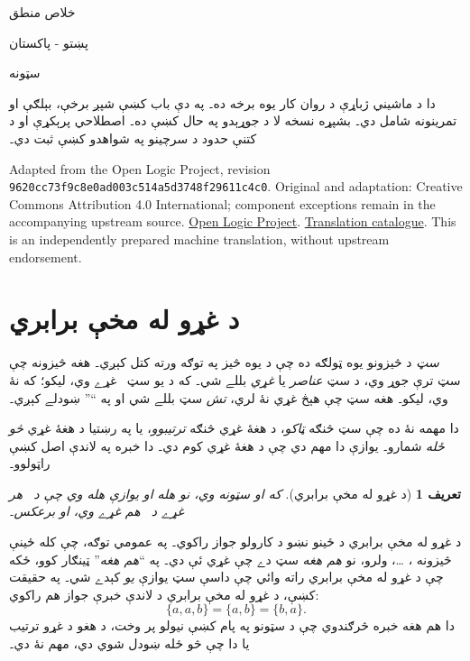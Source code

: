 \documentclass[12pt,a4paper]{article}
\newcommand{\olfileid}[3]{\gdef\pspart{#1}\gdef\pschapter{#2}\gdef\pssection{#3}}
\newcommand{\olsection}[1]{\section{#1}\label{\pspart:\pschapter:\pssection:sec}}
\newenvironment{explain}{}{}
\newtheorem{defn}{تعريف}[section]
\begin{document}
\setRTL
\begin{center}
{\Huge خلاص منطق}\par
{\Large پښتو - پاکستان}\par\medskip
{\LARGE سټونه}\par\medskip
\end{center}
دا د ماشيني ژباړې د روان کار يوه برخه ده۔ په دې باب کښې شپږ برخې، بېلګې او تمرينونه شامل دي۔ بشپړه نسخه لا د جوړېدو په حال کښې ده۔ اصطلاحي پرېکړې او د کتنې حدود د سرچينو په شواهدو کښې ثبت دي۔
\begin{LTR}\latinfont\small
Adapted from the Open Logic Project, revision
\texttt{9620cc73f9c8e0ad003c514a5d3748f29611c4c0}.
Original and adaptation: Creative Commons Attribution 4.0 International;
component exceptions remain in the accompanying upstream source.
\href{https://openlogicproject.org/}{Open Logic Project}.
\href{https://github.com/KokunoYumeto/OpenLogic-translations}{Translation catalogue}.
This is an independently prepared machine translation, without upstream endorsement.
\end{LTR}
\bigskip



\olfileid{sfr}{set}{bas}
\olsection{د غړو له مخې برابري}

\emph{سټ} د څيزونو يوه ټولګه ده چې د يوه څيز په توګه ورته کتل کېږي۔ هغه څيزونه چې سټ ترې جوړ وي، د سټ \emph{عناصر} يا \emph{غړي} بللے شي۔ که  د يو سټ~ غړے وي،  ليکو؛ که نۀ وي،  ليکو۔ هغه سټ چې هېڅ غړي نۀ لري، \emph{تش} سټ بللے شي او په ``\LR{$\emptyset$}'' ښودلے کېږي۔

\begin{explain}
دا مهمه نۀ ده چې سټ څنګه \emph{ټاکو}، د هغۀ غړي څنګه \emph{ترتيبوو}، يا په رښتيا د هغۀ غړي \emph{څو ځله} شمارو۔ يوازې دا مهم دي چې د هغۀ غړي کوم دي۔ دا خبره په لاندې اصل کښې راټولوو۔
\end{explain}

\begin{defn}[د غړو له مخې برابري]
  که  او  سټونه وي، نو  هله او يوازې هله وي چې د~ هر غړے د~ هم غړے وي، او برعکس۔
\end{defn}

د غړو له مخې برابري د ځينو نښو د کارولو جواز راکوي۔ په عمومي توګه، چې کله ځينې څيزونه ، \dots،  ولرو، نو  \emph{هم هغه} سټ دے چې غړي ئې  دي۔ په ``\emph{هم هغه}'' ټينګار کوو، ځکه چې د غړو له مخې برابري راته وائي چې داسې سټ يوازې \emph{يو} کېدے شي۔ په حقيقت کښې، د غړو له مخې برابري د لاندې خبرې جواز هم راکوي:
  \[
    \{a, a, b\} = \{a, b\} = \{b,a\}.
  \]
دا هم هغه خبره څرګندوي چې د سټونو په پام کښې نيولو پر وخت، د هغو د غړو ترتيب يا دا چې څو ځله ښودل شوي دي، مهم نۀ دي۔
\end{document}
